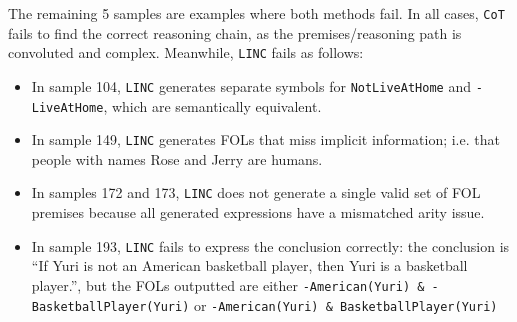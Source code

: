 The remaining 5 samples are examples where both methods fail. In all cases, \texttt{CoT} fails to find the correct reasoning chain, as the premises/reasoning path is convoluted and complex. Meanwhile, \texttt{LINC} fails as follows:
\begin{itemize}
    \item In sample 104, \texttt{LINC} generates separate symbols for \texttt{NotLiveAtHome} and \texttt{-LiveAtHome}, which are semantically equivalent.
    \item In sample 149, \texttt{LINC} generates FOLs that miss implicit information; i.e. that people with names Rose and Jerry are humans.
    \item In samples 172 and 173, \texttt{LINC} does not generate a single valid set of FOL premises because all generated expressions have a mismatched arity issue.
    \item In sample 193, \texttt{LINC} fails to express the conclusion correctly: the conclusion is ``If Yuri is not an American basketball player, then Yuri is a basketball player.'', but the FOLs outputted are either \texttt{-American(Yuri) \& -BasketballPlayer(Yuri)} or \texttt{-American(Yuri) \& BasketballPlayer(Yuri)}
\end{itemize}